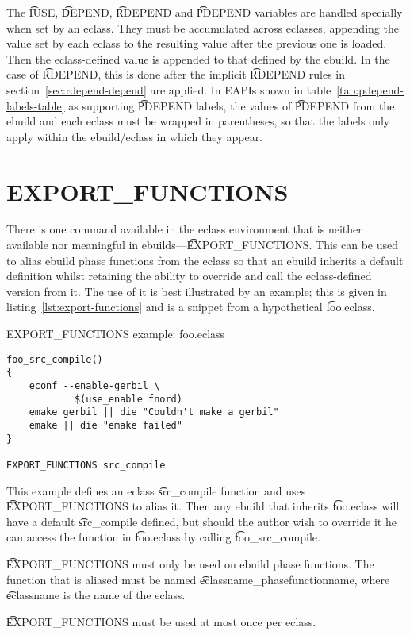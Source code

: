 The \t{IUSE}, \t{DEPEND}, \t{RDEPEND} and \t{PDEPEND} variables are handled specially
when set by an eclass. They must be accumulated across eclasses, appending the value set by each
eclass to the resulting value after the previous one is loaded. Then the eclass-defined value is
appended to that defined by the ebuild. In the case of \t{RDEPEND}, this is done after the
implicit \t{RDEPEND} rules in section~\ref{sec:rdepend-depend} are applied.
\IFKDEBUILDELSE
{
     In EAPIs shown in table~\ref{tab:pdepend-labels-table} as
    supporting \t{PDEPEND} labels, the values of \t{PDEPEND} from the ebuild and each eclass must be
    wrapped in parentheses, so that the labels only apply within the ebuild/eclass in which they
    appear.
}{
}

\section{EXPORT\_FUNCTIONS}

There is one command available in the eclass environment that is neither available nor meaningful
in ebuilds---\t{EXPORT\_FUNCTIONS}. This can be used to alias ebuild phase functions from the
eclass so that an ebuild inherits a default definition whilst retaining the ability to override and
call the eclass-defined version from it. The use of it is best illustrated by an example; this is
given in listing~\ref{lst:export-functions} and is a snippet from a hypothetical \t{foo.eclass}.

\begin{listing}
  \caption{EXPORT\_FUNCTIONS example: foo.eclass}\label{lst:export-functions}
  \begin{verbatim}
foo_src_compile()
{
    econf --enable-gerbil \
            $(use_enable fnord)
    emake gerbil || die "Couldn't make a gerbil"
    emake || die "emake failed"
}

EXPORT_FUNCTIONS src_compile
  \end{verbatim}
\end{listing}

This example defines an eclass \t{src\_compile} function and uses \t{EXPORT\_FUNCTIONS} to alias
it. Then any ebuild that inherits \t{foo.eclass} will have a default \t{src\_compile} defined, but
should the author wish to override it he can access the function in \t{foo.eclass} by calling
\t{foo\_src\_compile}.

\t{EXPORT\_FUNCTIONS} must only be used on ebuild phase functions. The function that is aliased
must be named \t{eclassname\_phasefunctionname}, where \t{eclassname} is the name of the eclass.

\t{EXPORT\_FUNCTIONS} must be used at most once per eclass.


